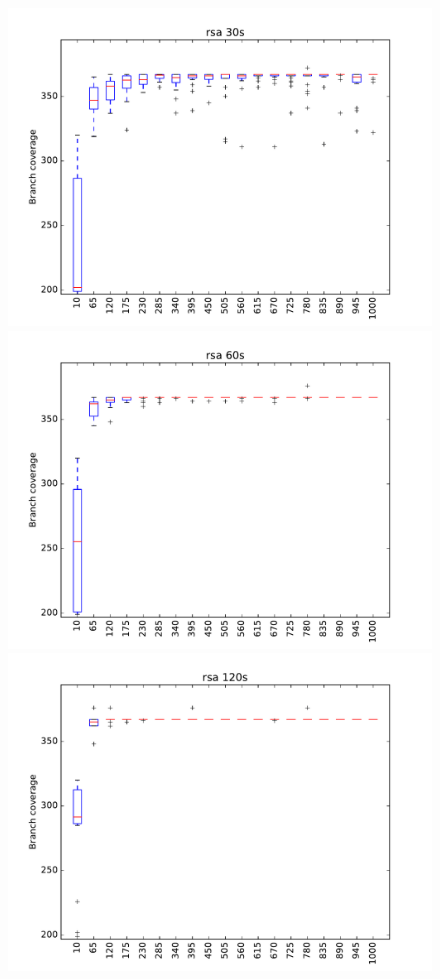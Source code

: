 \begin{figure}
\includegraphics[width=\columnwidth]{graphs/rsarand30}
\includegraphics[width=\columnwidth]{graphs/rsarand60}
\includegraphics[width=\columnwidth]{graphs/rsarand120}
\end{figure}


